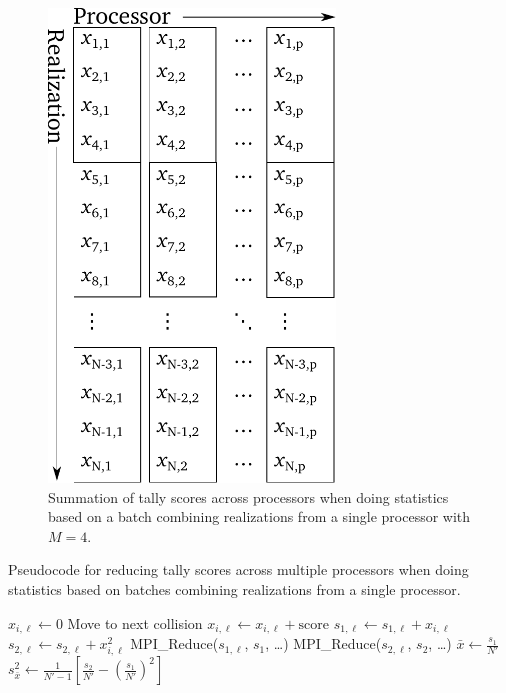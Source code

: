 \begin{figure}[htb]
  \centering
  \includegraphics[width=3in]{figures/ch4/batch-parallel.pdf}
  \caption{Summation of tally scores across processors when doing statistics
    based on a batch combining realizations from a single processor with $M=4$.}
  \label{fig:batch-parallel}
\end{figure}
\begin{algorithm}[htb]
  \caption{Pseudocode for reducing tally scores across multiple processors when
    doing statistics based on batches combining realizations from a single
    processor.}
  \label{alg:batch-parallel}
\begin{algorithmic}
   
    \State $x_{i,\ell} \gets 0$
     
       
          \State Move to next collision
          \State $x_{i,\ell} \gets x_{i,\ell} + \text{score}$
        \EndWhile
      \EndFor
    \EndFor
    \State $s_{1,\ell} \gets s_{1,\ell} + x_{i,\ell}$ 
    \State $s_{2,\ell} \gets s_{2,\ell} + x_{i,\ell}^2$
  \EndFor
  \State MPI\_Reduce($s_{1,\ell}$, $s_1$, \dots) 
  \State MPI\_Reduce($s_{2,\ell}$, $s_2$, \dots) 
  \State $\bar{x} \gets \frac{s_1}{N'}$ 
  \State $s^2_{\bar{x}} \gets \frac{1}{N'-1} \left [
      \frac{s_2}{N'} - \left ( \frac{s_1}{N'} \right )^2 \right ]$
\end{algorithmic}
\end{algorithm}
